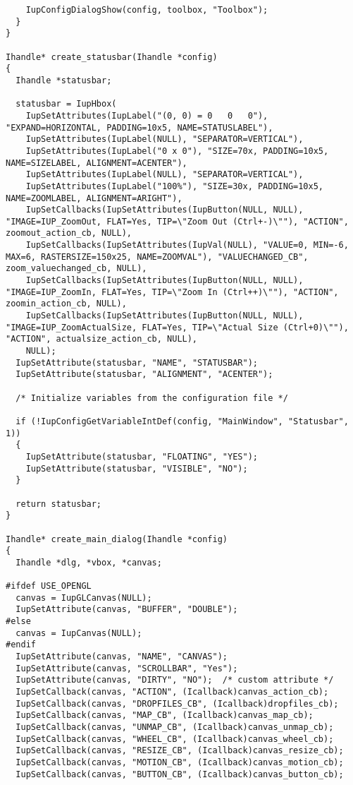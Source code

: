 \documentclass{ctexart}
\begin{document}
\begin{lstlisting}
    IupConfigDialogShow(config, toolbox, "Toolbox");
  }
}

Ihandle* create_statusbar(Ihandle *config)
{
  Ihandle *statusbar;

  statusbar = IupHbox(
    IupSetAttributes(IupLabel("(0, 0) = 0   0   0"), "EXPAND=HORIZONTAL, PADDING=10x5, NAME=STATUSLABEL"),
    IupSetAttributes(IupLabel(NULL), "SEPARATOR=VERTICAL"),
    IupSetAttributes(IupLabel("0 x 0"), "SIZE=70x, PADDING=10x5, NAME=SIZELABEL, ALIGNMENT=ACENTER"),
    IupSetAttributes(IupLabel(NULL), "SEPARATOR=VERTICAL"),
    IupSetAttributes(IupLabel("100%"), "SIZE=30x, PADDING=10x5, NAME=ZOOMLABEL, ALIGNMENT=ARIGHT"),
    IupSetCallbacks(IupSetAttributes(IupButton(NULL, NULL), "IMAGE=IUP_ZoomOut, FLAT=Yes, TIP=\"Zoom Out (Ctrl+-)\""), "ACTION", zoomout_action_cb, NULL),
    IupSetCallbacks(IupSetAttributes(IupVal(NULL), "VALUE=0, MIN=-6, MAX=6, RASTERSIZE=150x25, NAME=ZOOMVAL"), "VALUECHANGED_CB", zoom_valuechanged_cb, NULL),
    IupSetCallbacks(IupSetAttributes(IupButton(NULL, NULL), "IMAGE=IUP_ZoomIn, FLAT=Yes, TIP=\"Zoom In (Ctrl++)\""), "ACTION", zoomin_action_cb, NULL),
    IupSetCallbacks(IupSetAttributes(IupButton(NULL, NULL), "IMAGE=IUP_ZoomActualSize, FLAT=Yes, TIP=\"Actual Size (Ctrl+0)\""), "ACTION", actualsize_action_cb, NULL),
    NULL);
  IupSetAttribute(statusbar, "NAME", "STATUSBAR");
  IupSetAttribute(statusbar, "ALIGNMENT", "ACENTER");

  /* Initialize variables from the configuration file */

  if (!IupConfigGetVariableIntDef(config, "MainWindow", "Statusbar", 1))
  {
    IupSetAttribute(statusbar, "FLOATING", "YES");
    IupSetAttribute(statusbar, "VISIBLE", "NO");
  }

  return statusbar;
}

Ihandle* create_main_dialog(Ihandle *config)
{
  Ihandle *dlg, *vbox, *canvas;

#ifdef USE_OPENGL
  canvas = IupGLCanvas(NULL);
  IupSetAttribute(canvas, "BUFFER", "DOUBLE");
#else
  canvas = IupCanvas(NULL);
#endif
  IupSetAttribute(canvas, "NAME", "CANVAS");
  IupSetAttribute(canvas, "SCROLLBAR", "Yes");
  IupSetAttribute(canvas, "DIRTY", "NO");  /* custom attribute */
  IupSetCallback(canvas, "ACTION", (Icallback)canvas_action_cb);
  IupSetCallback(canvas, "DROPFILES_CB", (Icallback)dropfiles_cb);
  IupSetCallback(canvas, "MAP_CB", (Icallback)canvas_map_cb);
  IupSetCallback(canvas, "UNMAP_CB", (Icallback)canvas_unmap_cb);
  IupSetCallback(canvas, "WHEEL_CB", (Icallback)canvas_wheel_cb);
  IupSetCallback(canvas, "RESIZE_CB", (Icallback)canvas_resize_cb);
  IupSetCallback(canvas, "MOTION_CB", (Icallback)canvas_motion_cb);
  IupSetCallback(canvas, "BUTTON_CB", (Icallback)canvas_button_cb);


\end{lstlisting}
\end{document}
